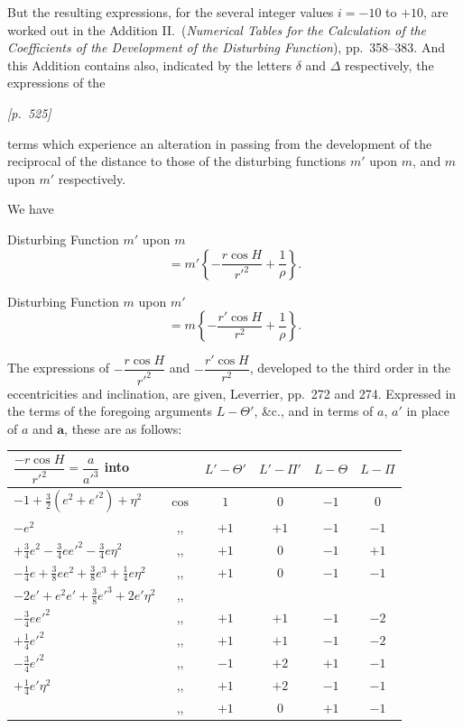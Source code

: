 \documentclass[11pt]{article}
\begin{document}
\medskip

But the resulting expressions, for the several integer values $i=-10$
to $+10$, are worked out in the Addition II.\ (\textit{Numerical Tables
for the Calculation of the Coefficients of the Development of the
Disturbing Function}), pp.~358--383. And this Addition contains also,
indicated by the letters $\delta$ and $\Delta$ respectively, the
expressions of the


\bigskip
\noindent\textit{[p.~525]}

\medskip

terms which experience an alteration in passing from the development of
the reciprocal of the distance to those of the disturbing functions $m'$
upon $m$, and $m$ upon $m'$ respectively.

\medskip

We have

\medskip

\noindent Disturbing Function $m'$ upon $m$
\[
=m'\left\{-\frac{r\cos H}{r'^2}+\frac{1}{\rho}\right\}.
\]

\noindent Disturbing Function $m$ upon $m'$
\[
=m\left\{-\frac{r'\cos H}{r^2}+\frac{1}{\rho}\right\}.
\]

The expressions of $-\dfrac{r\cos H}{r'^2}$ and $-\dfrac{r'\cos H}{r^2}$,
developed to the third order in the eccentricities and inclination, are
given, Leverrier, pp.~272 and 274. Expressed in the terms of the
foregoing arguments $L-\Theta'$, \&c., and in terms of $a$, $a'$ in place
of $a$ and $\mathbf{a}$, these are as follows:

\medskip

\begin{center}
\begin{tabular}{|l|c|c|c|c|c|}
\hline
$\dfrac{-r\cos H}{r'^2}=\dfrac{a}{a'^3}$ into & & $L'-\Theta'$ & $L'-\Pi'$ & $L-\Theta$ & $L-\Pi$ \\
\hline
$-1+\tfrac{3}{2}(e^2+e'^2)+\eta^2$ & $\cos$ & $1$ & $0$ & $-1$ & $0$ \\
$-e^2$ & ,, & $+1$ & $+1$ & $-1$ & $-1$ \\
$+\tfrac{3}{4}e^2-\tfrac{3}{4}ee'^2-\tfrac{3}{4}e\eta^2$ & ,, & $+1$ & $0$ & $-1$ & $+1$ \\
$-\tfrac{1}{4}e+\tfrac{3}{8}ee^2+\tfrac{3}{8}e^3+\tfrac{1}{4}e\eta^2$ & ,, & $+1$ & $0$ & $-1$ & $-1$ \\
$-2e'+e^2e'+\tfrac{3}{8}e'^3+2e'\eta^2$ & ,, & & & & \\
$-\tfrac{3}{4}e e'^2$ & ,, & $+1$ & $+1$ & $-1$ & $-2$ \\
$+\tfrac{1}{4}e'^2$ & ,, & $+1$ & $+1$ & $-1$ & $-2$ \\
$-\tfrac{3}{4}e'^2$ & ,, & $-1$ & $+2$ & $+1$ & $-1$ \\
$+\tfrac{1}{4}e'\eta^2$ & ,, & $+1$ & $+2$ & $-1$ & $-1$ \\
 & ,, & $+1$ & $0$ & $+1$ & $-1$ \\
\hline
\end{tabular}
\end{center}
\end{document}

